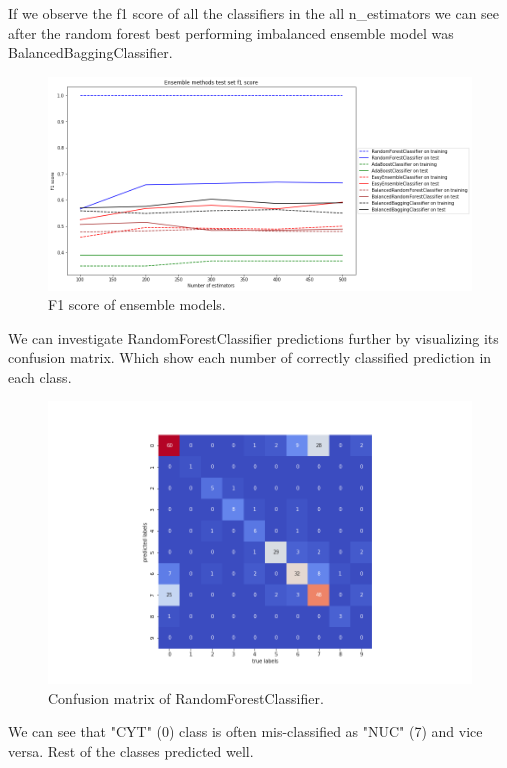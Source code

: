 \documentclass[12pt]{article}
\begin{document}
If we observe the f1 score of all the classifiers in the all n\_estimators we can see after the random forest best performing imbalanced ensemble model was BalancedBaggingClassifier.

\begin{figure}[H] \label{fig:ensemblepf}
    \centering
    \includegraphics[width=\textwidth]{img/ensembletestf1.png}
    \caption{F1 score of ensemble models.}
\end{figure}

We can investigate RandomForestClassifier predictions further by visualizing its confusion matrix. Which show each number of correctly classified prediction in each class.

\begin{figure}[H] \label{fig:rfconfusion}
    \centering
    \includegraphics[width=\textwidth]{img/rfheatmap.png}
    \caption{Confusion matrix of RandomForestClassifier.}
\end{figure}

We can see that "CYT" (0) class is often mis-classified as "NUC" (7) and vice versa. Rest of the classes predicted well.
\end{document}
